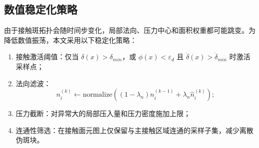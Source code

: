 \subsection{数值稳定化策略}
由于接触斑拓扑会随时间步变化，局部法向、压力中心和面积权重都可能跳变。为降低数值振荡，本文采用以下稳定化策略：
\begin{enumerate}[label=(\arabic*)]
    \item 接触激活阈值：仅当 $\delta(x)>\delta_{min}$，或 $\phi(x)<\varepsilon_d$ 且 $\dot{\delta}(x)>\dot{\delta}_{min}$ 时激活采样点；
    \item 法向滤波：
    \begin{equation}
    n_i^{(k)}\leftarrow \text{normalize}\left((1-\lambda_n)n_i^{(k-1)}+\lambda_n \hat{n}_i^{(k)}\right);
    \end{equation}
    \item 压力截断：对异常大的局部压入量和压力密度施加上限；
    \item 连通性筛选：在接触面元图上仅保留与主接触区域连通的采样子集，减少离散伪斑块。
\end{enumerate}
